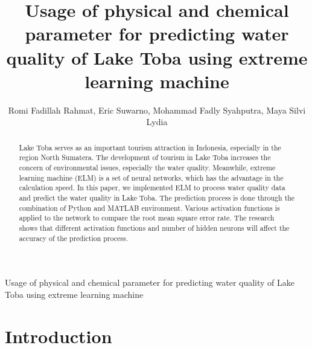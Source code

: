 \documentclass{ws-ijait}
\begin{document}
{Usage of physical and chemical parameter for predicting water quality of Lake Toba using extreme learning machine}

%
\catchline{}{}{}{}{}
%

\title{Usage of physical and chemical parameter for predicting water quality of Lake Toba using extreme learning machine}

\author{Romi Fadillah Rahmat, Eric Suwarno, Mohammad Fadly Syahputra, Maya Silvi Lydia}

\address{Department of Information Technology, University of Sumatera Utara, Alumni Road no. 3\\
Medan, North Sumatera,
Indonesia\\
romi.fadillah@usu.ac.id, 121402071.es@gmail.com, ncha.fadly@usu.ac.id, maya2@usu.ac.id}


\maketitle

\begin{history}
\end{history}

\begin{abstract}
Lake Toba serves as an important tourism attraction in Indonesia, especially in the region North Sumatera. The development of tourism in Lake Toba increases the concern of environmental issues, especially the water quality. Meanwhile, extreme learning machine (ELM) is a set of neural networks, which has the advantage in the calculation speed. In this paper, we implemented ELM to process water quality data and predict the water quality in Lake Toba. The prediction process is done through the combination of Python and MATLAB environment. Various activation functions is applied to the network to compare the root mean square error rate. The research shows that different activation functions and number of hidden neurons will affect the accuracy of the prediction process.
\end{abstract}


\section{Introduction}	
\end{document}
